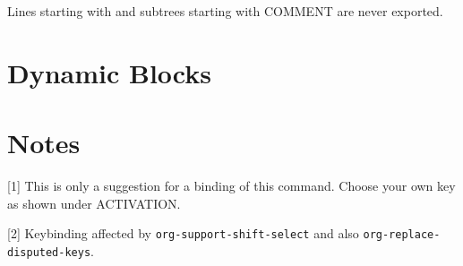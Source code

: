 
Lines starting with \kbd{\#} and subtrees starting with COMMENT are
never exported.


\section{Dynamic Blocks}


\section{Notes}
[1] This is only a suggestion for a binding of this command.  Choose
your own key as shown under ACTIVATION.

[2] Keybinding affected by {\tt org-support-shift-select} and also
 {\tt org-replace-disputed-keys}.

\copyrightnotice

\bye

